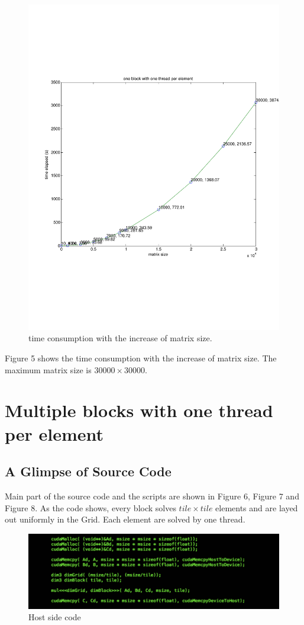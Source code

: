 \documentclass {article}
\begin{document}
\begin{figure}[htp!]
\centering
\includegraphics[width=0.8\linewidth]{r_gpu11.pdf}
\caption{time consumption with the increase of matrix size.}
\label{fig:four}
\end{figure}

Figure 5 shows the time consumption with the increase of matrix size. The maximum matrix size is $30000 \times 30000$.

\section{Multiple blocks with one thread per element}
\subsection{A Glimpse of Source Code}
Main part of the source code and the scripts are shown in Figure 6, Figure 7 and Figure 8. As the code shows, every block solves $tile \times tile$ elements and are layed out uniformly in the Grid. Each element are solved by one thread.

\begin{figure}[htp!]
\centering
\includegraphics[width = \linewidth]{gpu21.pdf}
\caption{Host side code}
\label{fig:gpu21}
\end{figure}
\end{document}
